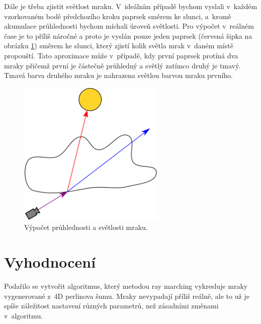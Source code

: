 \documentclass[a4paper, 12pt]{article}
\begin{document}
Dále je třeba zjistit světlost mraku. V~ideálním případě bychom vyslali
v~každém vzorkovaném bodě předchozího kroku paprsek směrem ke slunci,
a~kromě akumulace průhlednosti bychom míchali úroveň světlosti.
Pro výpočet v~reálném čase je to příliš náročné a proto je vyslán pouze
jeden paprsek (červená šipka na obrázku \ref{fig:cloud-marching}) směrem ke slunci,
který zjistí kolik světla mrak v~daném místě propouští. Tato aproximace může
v~případě, kdy první paprsek protíná dva mraky přičemž první je částečně průhledný
a světlý zatímco druhý je tmavý. Tmavá barva druhého mraku je nahrazena světlou
barvou mraku prvního.

\begin{figure}
  \centering
  \includegraphics[width=7cm,keepaspectratio]{img/cloud-marching}
  \caption{Výpočet průhlednosti a světlosti mraku.}
  \label{fig:cloud-marching}
\end{figure}


\section{Vyhodnocení}


Podařilo se vytvořit algoritmus, který metodou ray marching vykresluje
mraky vygenerované z~4D perlinova šumu. Mraky nevypadají příliš reálně, ale
to už je spíše záležitost nastavení různých parametrů, než zásadními změnami
v~algoritmu.
\end{document}
